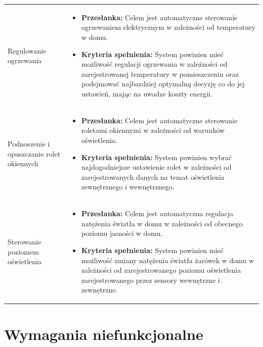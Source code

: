 \documentclass{article}
\begin{document}
\begin{center}
{\begin{longtable}{p{5cm}p{10cm}}
	Regulowanie ogrzewania&
	\begin{itemize}
	\item \textbf{Przesłanka:} Celem jest automatyczne sterowanie ogrzewaniem elektrycznym w zależności od temperatury w domu.
	\item \textbf{Kryteria spełnienia:} System powinien mieć możliwość regulacji ogrzewania w zależności od zarejestrowanej temperatury w pomieszczeniu oraz podejmować najbardziej optymalną decyzję co do jej ustawień, mając na uwadze koszty energii.
	\end{itemize}\\
	
	Podnoszenie i opuszczanie rolet okiennych&
	\begin{itemize}
	\item \textbf{Przesłanka:} Celem jest automatyczne sterowanie roletami okiennymi w zależności od warunków oświetlenia.
	\item \textbf{Kryteria spełnienia:} System powinien wybrać najdogodniejsze ustawienie rolet w zależności od zarejestrowanych danych na temat oświetlenia zewnętrznego i wewnętrznego.
	\end{itemize}\\

	Sterowanie poziomem oświetlenia&
	\begin{itemize}
	\item \textbf{Przesłanka:} Celem jest automatyczna regulacja natężenia światła w domu w zależności od obecnego poziomu jasności w domu.
	\item \textbf{Kryteria spełnienia:} System powinien mieć możliwość zmiany natężenia światła żarówek w domu w zależności od zarejestrowanego poziomu oświetlenia zarejestrowanego przez sensory wewnętrzne i zewnętrzne.
	\end{itemize}\\

\end{longtable}}
\end{center}

\section{Wymagania niefunkcjonalne}
\end{document}
